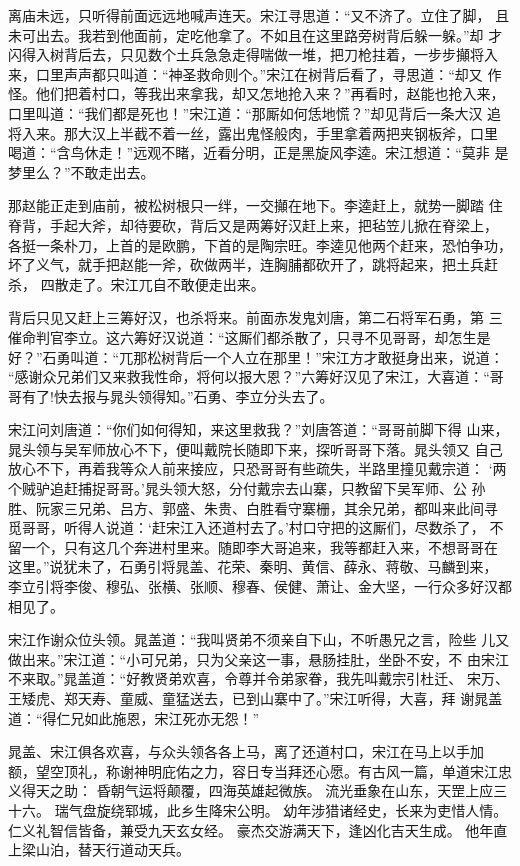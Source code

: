 离庙未远，只听得前面远远地喊声连天。宋江寻思道：“又不济了。立住了脚，
且未可出去。我若到他面前，定吃他拿了。不如且在这里路旁树背后躲一躲。”却
才闪得入树背后去，只见数个土兵急急走得喘做一堆，把刀枪拄着，一步步攧将入
来，口里声声都只叫道：“神圣救命则个。”宋江在树背后看了，寻思道：“却又
作怪。他们把着村口，等我出来拿我，却又怎地抢入来？”再看时，赵能也抢入来，
口里叫道：“我们都是死也！”宋江道：“那厮如何恁地慌？”却见背后一条大汉
追将入来。那大汉上半截不着一丝，露出鬼怪般肉，手里拿着两把夹钢板斧，口里
喝道：“含鸟休走！”远观不睹，近看分明，正是黑旋风李逵。宋江想道：“莫非
是梦里么？”不敢走出去。

那赵能正走到庙前，被松树根只一绊，一交攧在地下。李逵赶上，就势一脚踏
住脊背，手起大斧，却待要砍，背后又是两筹好汉赶上来，把毡笠儿掀在脊梁上，
各挺一条朴刀，上首的是欧鹏，下首的是陶宗旺。李逵见他两个赶来，恐怕争功，
坏了义气，就手把赵能一斧，砍做两半，连胸脯都砍开了，跳将起来，把土兵赶杀，
四散走了。宋江兀自不敢便走出来。

背后只见又赶上三筹好汉，也杀将来。前面赤发鬼刘唐，第二石将军石勇，第
三催命判官李立。这六筹好汉说道：“这厮们都杀散了，只寻不见哥哥，却怎生是
好？”石勇叫道：“兀那松树背后一个人立在那里！”宋江方才敢挺身出来，说道：
“感谢众兄弟们又来救我性命，将何以报大恩？”六筹好汉见了宋江，大喜道：“哥
哥有了!快去报与晁头领得知。”石勇、李立分头去了。

宋江问刘唐道：“你们如何得知，来这里救我？”刘唐答道：“哥哥前脚下得
山来，晁头领与吴军师放心不下，便叫戴院长随即下来，探听哥哥下落。晁头领又
自己放心不下，再着我等众人前来接应，只恐哥哥有些疏失，半路里撞见戴宗道：
‘两个贼驴追赶捕捉哥哥。’晁头领大怒，分付戴宗去山寨，只教留下吴军师、公
孙胜、阮家三兄弟、吕方、郭盛、朱贵、白胜看守寨栅，其余兄弟，都叫来此间寻
觅哥哥，听得人说道：‘赶宋江入还道村去了。’村口守把的这厮们，尽数杀了，
不留一个，只有这几个奔进村里来。随即李大哥追来，我等都赶入来，不想哥哥在
这里。”说犹未了，石勇引将晁盖、花荣、秦明、黄信、薛永、蒋敬、马麟到来，
李立引将李俊、穆弘、张横、张顺、穆春、侯健、萧让、金大坚，一行众多好汉都
相见了。

宋江作谢众位头领。晁盖道：“我叫贤弟不须亲自下山，不听愚兄之言，险些
儿又做出来。”宋江道：“小可兄弟，只为父亲这一事，悬肠挂肚，坐卧不安，不
由宋江不来取。”晁盖道：“好教贤弟欢喜，令尊并令弟家眷，我先叫戴宗引杜迁、
宋万、王矮虎、郑天寿、童威、童猛送去，已到山寨中了。”宋江听得，大喜，拜
谢晁盖道：“得仁兄如此施恩，宋江死亦无怨！”

晁盖、宋江俱各欢喜，与众头领各各上马，离了还道村口，宋江在马上以手加
额，望空顶礼，称谢神明庇佑之力，容日专当拜还心愿。有古风一篇，单道宋江忠
义得天之助：
昏朝气运将颠覆，四海英雄起微族。
流光垂象在山东，天罡上应三十六。
瑞气盘旋绕郓城，此乡生降宋公明。
幼年涉猎诸经史，长来为吏惜人情。
仁义礼智信皆备，兼受九天玄女经。
豪杰交游满天下，逢凶化吉天生成。
他年直上梁山泊，替天行道动天兵。

